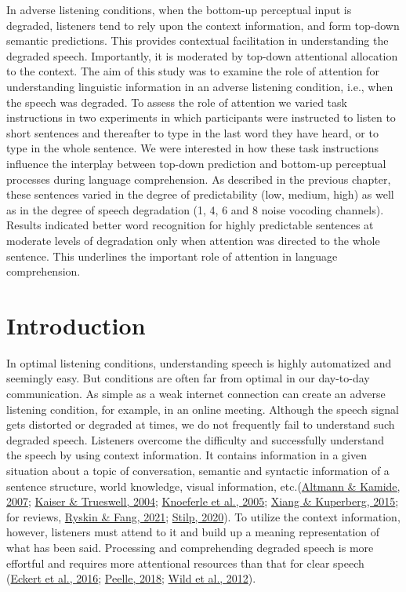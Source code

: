 \documentclass[a4paper, nobind]{templates/ociamthesis}
\begin{document}
In adverse listening conditions, when the bottom-up perceptual input is degraded, listeners tend to rely upon the context information, and form top-down semantic predictions.
This provides contextual facilitation in understanding the degraded speech.
Importantly, it is moderated by top-down attentional allocation to the context.
The aim of this study was to examine the role of attention for understanding linguistic information in an adverse listening condition, i.e., when the speech was degraded.
To assess the role of attention we varied task instructions in two experiments in which participants were instructed to listen to short sentences and thereafter to type in the last word they have heard, or to type in the whole sentence.
We were interested in how these task instructions influence the interplay between top-down prediction and bottom-up perceptual processes during language comprehension.
As described in the previous chapter, these sentences varied in the degree of predictability (low, medium, high) as well as in the degree of speech degradation (1, 4, 6 and 8 noise vocoding channels).
Results indicated better word recognition for highly predictable sentences at moderate levels of degradation only when attention was directed to the whole sentence.
This underlines the important role of attention in language comprehension.

\hypertarget{introduction}{%
\section{Introduction}\label{introduction}}

In optimal listening conditions, understanding speech is highly automatized and seemingly easy.
But conditions are often far from optimal in our day-to-day communication.
As simple as a weak internet connection can create an adverse listening condition, for example, in an online meeting.
Although the speech signal gets distorted or degraded at times, we do not frequently fail to understand such degraded speech.
Listeners overcome the difficulty and successfully understand the speech by using context information.
It contains information in a given situation about a topic of conversation, semantic and syntactic information of a sentence structure, world knowledge, visual information, etc.(\protect\hyperlink{ref-Altmann2007}{Altmann \& Kamide, 2007}; \protect\hyperlink{ref-Kaiser2004}{Kaiser \& Trueswell, 2004}; \protect\hyperlink{ref-Knoeferle2005}{Knoeferle et al., 2005}; \protect\hyperlink{ref-Xiang2015}{Xiang \& Kuperberg, 2015}; for reviews, \protect\hyperlink{ref-Ryskin2021}{Ryskin \& Fang, 2021}; \protect\hyperlink{ref-Stilp2020}{Stilp, 2020}).
To utilize the context information, however, listeners must attend to it and build up a meaning representation of what has been said.
Processing and comprehending degraded speech is more effortful and requires more attentional resources than that for clear speech (\protect\hyperlink{ref-Eckert2016}{Eckert et al., 2016}; \protect\hyperlink{ref-Peelle2018}{Peelle, 2018}; \protect\hyperlink{ref-Wild2012}{Wild et al., 2012}).
\end{document}
